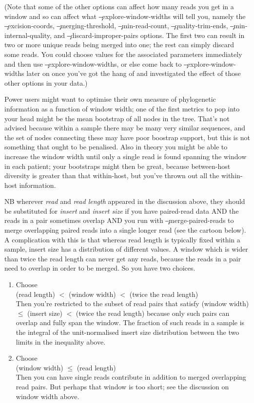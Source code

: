 (Note that some of the other options can affect how many reads you get in a window and so can affect what \c{--explore-window-widths} will tell you, namely the \c{--excision-coords}, \c{--merging-threshold}, \c{--min-read-count}, \c{--quality-trim-ends}, \c{--min-internal-quality}, and \c{--discard-improper-pairs} options.
The first two can result in two or more unique reads being merged into one; the rest can simply discard some reads.
You could choose values for the associated parameters immediately and then use \c{--explore-window-widths}, or else come back to \c{--explore-window-widths} later on once you've got the hang of \p and investigated the effect of those other options in your data.)  

Power users might want to optimise their own measure of phylogenetic information as a function of window width; one of the first metrics to pop into your head might be the mean bootstrap of all nodes in the tree.
That's not advised because within a sample there may be many very similar sequences, and the set of nodes connecting these may have poor boostrap support, but this is not something that ought to be penalised.
Also in theory you might be able to increase the window width until only a single read is found spanning the window in each patient; your bootstraps might then be great, because between-host diversity is greater than that within-host, but you've thrown out all the within-host information.

NB wherever {\it read} and {\it read length} appeared in the discussion above, they should be substituted for {\it insert} and {\it insert size} if you have paired-read data AND the reads in a pair sometimes overlap AND you run \p with \c{--merge-paired-reads} to merge overlapping paired reads into a single longer read (see the cartoon below).
A complication with this is that whereas read length is typically fixed within a sample, insert size has a distribution of different values.
A window which is wider than twice the read length can never get any reads, because the reads in a pair need to overlap in order to be merged.
So you have two choices.
\begin{enumerate}
\item Choose\\  
(read length) $<$ (window width) $<$ (twice the read length)\\  
Then you're restricted to the subset of read pairs that satisfy  
(window width) $\leq$ (insert size) $<$ (twice the read length)  
because only such pairs can overlap and fully span the window.
The fraction of such reads in a sample is the integral of the unit-normalised insert size distribution between the two limits in the inequality above.
\item Choose\\  
(window width) $\leq$ (read length)\\  
Then you can have single reads contribute in addition to merged overlapping read pairs.
But perhaps that window is too short; see the discussion on window width above.
\end{enumerate}

